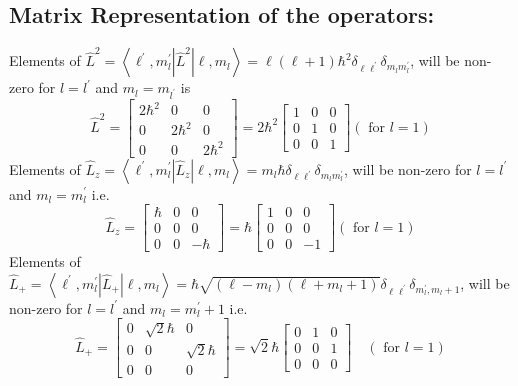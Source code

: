 \subsection{ Matrix Representation of the operators:}
Elements of $\hat{L}^{2}=\left\langle\ell^{\prime}, m_{l}^{\prime}\left|\hat{L}^{2}\right| \ell, m_{l}\right\rangle=\ell(\ell+1) \hbar^{2} \delta_{\ell \ell^{\prime}} \delta_{m_{l} m_{l}^{\prime}}$, will be non-zero for $l=l^{\prime}$ and $m_{l}=m_{l^{\prime}}$ is
$$
\hat{L}^{2}=\left[\begin{array}{lll}
2 \hbar^{2} & 0 & 0 \\
0 & 2 \hbar^{2} & 0 \\
0 & 0 & 2 \hbar^{2}
\end{array}\right]=2 \hbar^{2}\left[\begin{array}{lll}
1 & 0 & 0 \\
0 & 1 & 0 \\
0 & 0 & 1
\end{array}\right](\text { for } l=1)
$$
Elements of $\hat{L}_{z}=\left\langle\ell^{\prime}, m_{l}^{\prime}\left|\hat{L}_{z}\right| \ell, m_{l}\right\rangle=m_{l} \hbar \delta_{\ell \ell^{\prime}} \delta_{m_{l} m_{l}^{\prime}}$, will be non-zero for $l=l^{\prime}$ and $m_{l}=m_{l}^{\prime}$ i.e.
$$
\hat{L}_{z}=\left[\begin{array}{ccc}
\hbar & 0 & 0 \\
0 & 0 & 0 \\
0 & 0 & -\hbar
\end{array}\right]=\hbar\left[\begin{array}{ccc}
1 & 0 & 0 \\
0 & 0 & 0 \\
0 & 0 & -1
\end{array}\right](\text { for } l=1)
$$
Elements of $\hat{L}_{+}=\left\langle\ell^{\prime}, m_{l}^{\prime}\left|\hat{L}_{+}\right| \ell, m_{l}\right\rangle=\hbar \sqrt{\left(\ell-m_{l}\right)\left(\ell+m_{l}+1\right)} \delta_{\ell \ell^{\prime}} \delta_{m_{l}^{\prime}, m_{l}+1}$, will be non-zero for $l=l^{\prime}$ and $m_{l}=m_{l}^{\prime}+1$ i.e.\\
$$\hat{L}_{+}=\left[\begin{array}{lll}
	0 & \sqrt{2} \hbar & 0 \\
	0 & 0 & \sqrt{2} \hbar \\
	0 & 0 & 0
\end{array}\right]=\sqrt{2} \hbar\left[\begin{array}{lll}
	0 & 1 & 0 \\
	0 & 0 & 1 \\
	0 & 0 & 0
\end{array}\right] \quad(\text { for } l=1)$$
